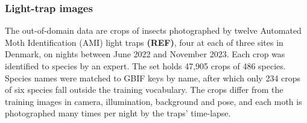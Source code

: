 \subsubsection{Light-trap images}\label{sec:data_traps}
The out-of-domain data are crops of insects photographed by twelve Automated Moth Identification (AMI) light traps \textbf{(REF)}, four at each of three sites in Denmark, on nights between June 2022 and November 2023.
Each crop was identified to species by an expert.
The set holds 47,905 crops of 486 species.
Species names were matched to GBIF keys by name, after which only 234 crops of six species fall outside the training vocabulary.
The crops differ from the training images in camera, illumination, background and pose, and each moth is photographed many times per night by the traps' time-lapse.
